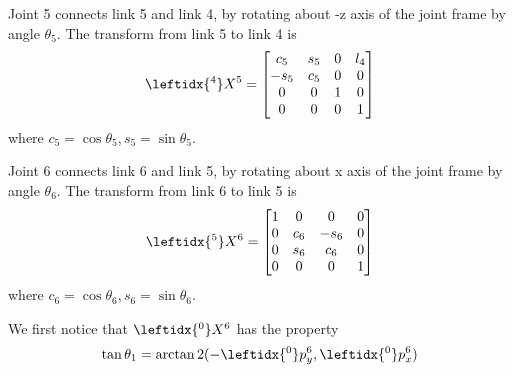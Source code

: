 \documentclass{article}
\begin{document}
Joint 5 connects link 5 and link 4, by rotating about -z axis of the joint frame by angle $\theta_5$. The transform from link 5 to link 4 is
\begin{align}
	\leftidx{^4}X^5 = \begin{bmatrix}
		c_5 & s_5 & 0 & l_4\\
		-s_5 & c_5 & 0 & 0\\
		0 & 0 & 1 & 0\\
		0 & 0 & 0 & 1
	\end{bmatrix}
\end{align}
where $c_5=\cos\theta_5,s_5=\sin\theta_5$.

Joint 6 connects link 6 and link 5, by rotating about x axis of the joint frame by angle $\theta_6$. The transform from link 6 to link 5 is
\begin{align}
	\leftidx{^5}X^6 = \begin{bmatrix}
		1 & 0 & 0 & 0\\
		0 & c_6 & -s_6 & 0\\
		0 & s_6 & c_6 & 0\\
		0 & 0 & 0 & 1
	\end{bmatrix}
\end{align}
where $c_6=\cos\theta_6, s_6=\sin\theta_6$.

We first notice that $\leftidx{^0}X^6$ has the property
\begin{align}
	\tan\theta_1 = \arctan2(-\leftidx{^0}p^6_y, \leftidx{^0}p^6_x)
\end{align}
\end{document}
